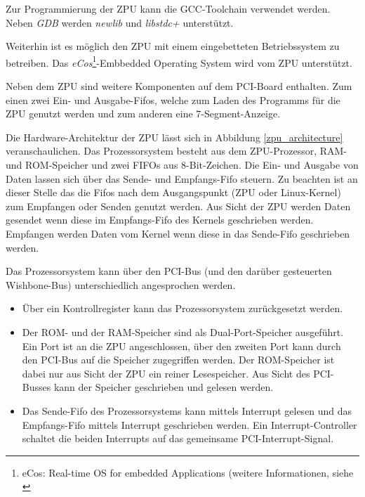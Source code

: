 \documentclass[11pt]{scrartcl}
\begin{document}
Zur Programmierung der ZPU kann die GCC-Toolchain verwendet werden. Neben \textit{GDB} werden \textit{newlib} und \textit{libstdc+} unterstützt.

Weiterhin ist es möglich den ZPU mit einem eingebetteten Betriebssystem zu betreiben. Das \textit{eCos}\footnote{eCos: Real-time OS for embedded Applications (weitere Informationen, siehe \cite{wp_eCos}}-Embbedded Operating System wird vom ZPU unterstützt. 

Neben dem ZPU sind weitere Komponenten auf dem PCI-Board enthalten. Zum einen zwei Ein- und Ausgabe-Fifos, welche zum Laden des Programms für die ZPU genutzt werden und zum anderen eine 7-Segment-Anzeige.

Die Hardware-Architektur der ZPU lässt sich in Abbildung \ref{zpu_architecture} veranschaulichen. Das Prozessorsystem besteht aus dem ZPU-Prozessor, RAM- und ROM-Speicher und zwei FIFOs aus 8-Bit-Zeichen. 
Die Ein- und Ausgabe von Daten lassen sich über das Sende- und Empfangs-Fifo steuern. Zu beachten ist an dieser Stelle das die Fifos nach dem Ausgangspunkt (ZPU oder Linux-Kernel) zum Empfangen oder Senden genutzt werden. Aus Sicht der ZPU werden Daten gesendet wenn diese im Empfangs-Fifo des Kernels geschrieben werden. Empfangen werden Daten vom Kernel wenn diese in das Sende-Fifo geschrieben werden. 

Das Prozessorsystem kann über den PCI-Bus (und den darüber gesteuerten Wishbone-Bus) unterschiedlich angesprochen werden.

\begin{itemize}
    \item{Über ein Kontrollregister kann das Prozessorsystem zurückgesetzt werden.}
    \item{Der ROM- und der RAM-Speicher sind als Dual-Port-Speicher ausgeführt. Ein Port ist an die ZPU angeschlossen, über den zweiten Port kann durch den PCI-Bus auf die Speicher zugegriffen werden. Der ROM-Speicher ist dabei nur aus Sicht der ZPU ein reiner Lesespeicher. Aus Sicht des PCI-Busses kann der Speicher geschrieben und gelesen werden.}
    \item{Das Sende-Fifo des Prozessorsystems kann mittels Interrupt gelesen und das Empfangs-Fifo mittels Interrupt geschrieben werden. Ein Interrupt-Controller schaltet die beiden Interrupts auf das gemeinsame PCI-Interrupt-Signal.}

\end{itemize}
\end{document}
